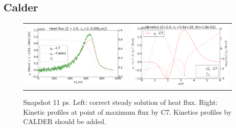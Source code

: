 \subsection{Calder}
\label{sec:CALDERcode}

\begin{figure}[tbh]
  \begin{center}
    \begin{tabular}{cc}
      \includegraphics[width=\figscale\textwidth]{../VFPdata/C7_Calder_case1_heatflux.png} & 
      \includegraphics[width=\figscale\textwidth]{../VFPdata/C7_Calder_case1_kinetics.png}
    \end{tabular}
  \caption{  
  Snapshot 11 ps. Left: correct steady solution of heat flux. Right: Kinetic profiles at point of maximum flux by C7. Kinetics profiles by CALDER should be added.
  }
  \end{center}
  \label{fig:C7_CALDER_case1}
\end{figure}

